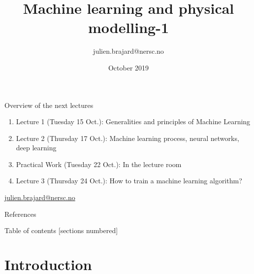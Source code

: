 \documentclass[handout]{beamer}
\title[Machine Learning]{Machine learning and physical modelling-1}
\author[J. Brajard]{julien.brajard@nersc.no}
\institute[NERSC]{NERSC\\
\url{https://github.com/brajard/MAT330}}
\date{October 2019}
\begin{document}
\begin{frame}
\titlepage
\end{frame}

\begin{frame}{Overview of the next lectures}
    \begin{enumerate}
        \item Lecture 1 (Tuesday 15 Oct.): Generalities and  principles of Machine Learning
        \item Lecture 2 (Thursday 17 Oct.): Machine learning process, neural networks, deep learning
        \item Practical Work (Tuesday 22 Oct.): \alert{In the lecture room}
        \item Lecture 3 (Thursday 24 Oct.): How to train a machine learning algorithm?
    \end{enumerate}
    \vspace{2em}
    \begin{center}
    \href{mailto://julien.brajard@nersc.no}{julien.brajard@nersc.no}
    \end{center}
    
\end{frame}

\begin{frame}{References}
    
    \nocite{Goodfellow-et-al-2016,VanderPlas-2016}

\end{frame}

\begin{frame}{Table of contents}
  [sections numbered]
  \tableofcontents[hideallsubsections]
\end{frame}




\section{Introduction}
\end{document}
